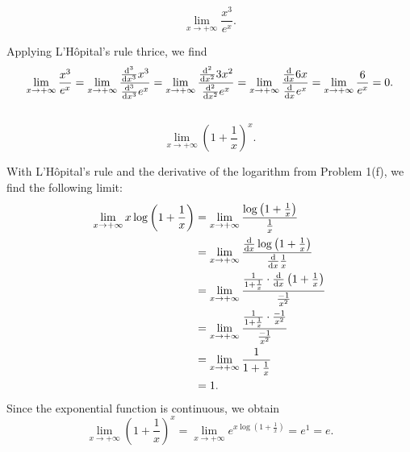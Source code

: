 \documentclass[12pt]{article}
\newenvironment{problem}
    {\begin{lrbox}{\mybox}\begin{minipage}{0.98\textwidth}}
    {\end{minipage}\end{lrbox}\begin{center}\framebox[\textwidth]{\usebox{\mybox}}\end{center}}
\theoremstyle{definition}
\begin{document}
\newpage
\subsection{}
\begin{problem}
    \begin{equation}
    \lim_{x\to +\infty} \frac{x^3}{e^x}.
    \end{equation}
\end{problem}

Applying L'H\^opital's rule thrice, we find
\[
    \lim_{x\to +\infty} \frac{x^3}{e^x}
        = \lim_{x\to +\infty} \frac{\dv[3]{x} x^3}{\dv[3]{x} e^x}
        = \lim_{x\to +\infty} \frac{\dv[2]{x} 3x^2}{\dv[2]{x} e^x}
        = \lim_{x\to +\infty} \frac{\dv{x} 6x}{\dv{x} e^x}
        = \lim_{x\to +\infty} \frac{6}{e^x}
        = 0.
\]

\subsection{}
\begin{problem}
    \begin{equation}
    \lim_{x\to +\infty} \left ( 1 + \frac{1}{x} \right )^x.
    \end{equation}
\end{problem}

With L'H\^opital's rule and the derivative of the logarithm from Problem 1(f), we find the following limit:
\begin{align*}
    \lim_{x \to +\infty} x \log \left( 1 + \frac{1}{x} \right)
        &= \lim_{x \to +\infty} \frac{\log \left( 1 + \frac{1}{x} \right)}{\frac1x} \\
        &= \lim_{x \to +\infty} \frac{\dv{x} \log \left( 1 + \frac{1}{x} \right)}{\dv{x} \frac1x} \\
        &= \lim_{x \to +\infty} \frac{\frac{1}{1 + \frac{1}{x}} \cdot \dv{x}\left(1 + \frac1x\right)}{\frac{-1}{x^2}} \\
        &= \lim_{x \to +\infty} \frac{\frac{1}{1 + \frac{1}{x}} \cdot \frac{-1}{x^2}}{\frac{-1}{x^2}} \\
        &= \lim_{x \to +\infty} \frac{1}{1 + \frac{1}{x}} \\
        &= 1.
\end{align*}
Since the exponential function is continuous, we obtain
\[
    \lim_{x\to +\infty} \left ( 1 + \frac{1}{x} \right )^x
        = \lim_{x\to +\infty} e^{x \log \left(1 + \frac{1}{x}\right)}
        = e^1
        = e.
\]
\end{document}
